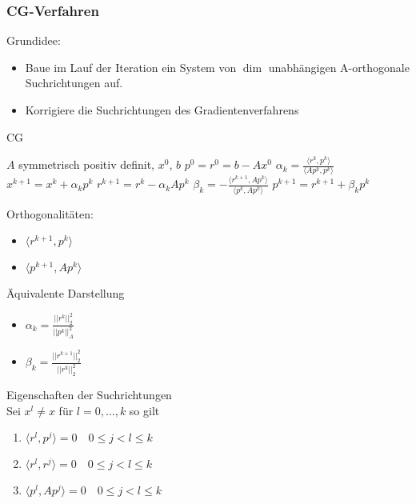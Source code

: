 \subsubsection{CG-Verfahren}
Grundidee:
\begin{itemize}
	\item Baue im Lauf der Iteration ein System von $\dim$ unabhängigen A-orthogonale Suchrichtungen auf.
	\item Korrigiere die Suchrichtungen des Gradientenverfahrens
\end{itemize}

\begin{algorithm}
	\caption{CG}
	\begin{algorithmic}
		\STATE $A$ symmetrisch positiv definit, $x^{0}$, $b$
		\STATE $p^{0} = r^{0} = b- Ax^{0}$
			\STATE $\alpha_{k}=\frac{\langle r^{k},p^{k}\rangle}{\langle A p^{k},p^{k}\rangle}$
			\STATE $x^{k+1} =  x^{k} + \alpha_{k} p^{k}$
			\STATE $r^{k+1} = r^{k} - \alpha_{k}Ap^{k}$
			\STATE $\beta_{k} = - \frac{\langle r^{k+1},Ap^{k}\rangle}{\langle p^{k},Ap^{k}\rangle}$
			\STATE $p^{k+1} = r^{k+1} + \beta_{k}p^{k}$
		\ENDFOR
	\end{algorithmic}
\end{algorithm}

\begin{remark}
	Orthogonalitäten:
	\begin{itemize}
		\item $\langle r^{k+1}, p^{k}\rangle$
		\item $\langle p^{k+1},Ap^{k}\rangle$
	\end{itemize}
\end{remark}

\begin{theorem}
	Äquivalente Darstellung
	\\
	\begin{itemize}
		\item $\alpha_{k}=\frac{||r^{k}||_{2}^{2}}{||p^{k}||_{A}^{2}}$
		\item $\beta_{k} = \frac{||r^{k+1}||^{2}_{2}}{||r^{k}||^{2}_{2}}$
	\end{itemize}
\end{theorem}


\begin{theorem}
	Eigenschaften der Suchrichtungen
	\\
	Sei $x^{l}\not = x$ für $l=0,\ldots,k$ so gilt
	\begin{enumerate}
		\item $\langle r^{l},p^{j}\rangle=0\quad 0\leq j<l\leq k$
		\item $\langle r^{l},r^{j}\rangle=0\quad 0\leq j<l\leq k$
		\item $\langle p^{l},Ap^{j}\rangle =0 \quad 0\leq j<l\leq k$
	\end{enumerate}
\end{theorem}